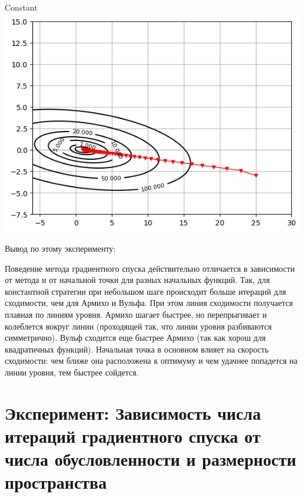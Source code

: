 \documentclass[12pt]{article}
\begin{document}
\begin{enumerate}
Constant
\includegraphics{exp1/x_0/3_constant.png}


\end{enumerate}

Вывод по этому эксперименту:

Поведение метода градиентного спуска действительно отличается в зависимости от метода и от начальной точки для разных начальных функций.  Так, для константной стратегии при небольшом шаге происходит больше итераций для сходимости, чем для Армихо и Вульфа. При этом линия сходимости получается плавная по линиям уровня. Армихо шагает быстрее, но перепрыгивает и колеблется вокруг линии (проходящей так, что линии уровня разбиваются симметрично). Вульф сходится еще быстрее Армихо (так как хорош для квадратичных функций). Начальная точка в основном влияет на скорость сходимости: чем ближе она расположена к оптимуму и чем удачнее попадется на линии уровня, тем быстрее сойдется.

\section{Эксперимент: Зависимость числа итераций градиентного спуска от числа обусловленности и размерности пространства} %
\end{document}
